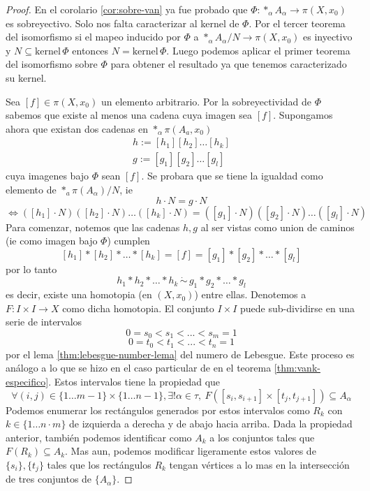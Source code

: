 \begin{proof}
  En el corolario \ref{cor:sobre-van} ya fue probado que \(\Phi :
  *_\alpha A_\alpha \to \pi (X, x_0)\) es sobreyectivo. Solo nos falta
  caracterizar al kernel de \(\Phi\). Por el tercer teorema del
  isomorfismo
  si el mapeo inducido por \(\Phi\) a \(*_\alpha A_\alpha / N \to \pi (X,
  x_0)\) es inyectivo y \(N \subseteq \text{kernel}\, \Phi\) entonces \(N =
  \text{kernel} \, \Phi\). Luego podemos aplicar el primer teorema del
  isomorfismo sobre \(\Phi\) para obtener el resultado ya que tenemos
  caracterizado su kernel.

  Sea \([f] \in \pi (X, x_0)\) un elemento arbitrario. Por la
  sobreyectividad de \(\Phi\) sabemos que existe al menos una cadena
  cuya imagen sea \([f]\). Supongamos ahora que existan dos cadenas en
  \(*_\alpha \pi (A_a, x_0)\)
  \begin{gather*}
    h := [h_1][h_2]\dotsc [h_k] \\
    g := [g _1][g _2]\dotsc [g _l]
  \end{gather*}
  cuya imagenes bajo \(\Phi\) sean \([f]\). Se probara que se tiene la
  igualdad como elemento de \(*_a \pi (A_\alpha) / N\), ie
  \[ h \cdot N = g\cdot N\]
  \[ \iff ([h_1]\cdot N) ([h_2] \cdot N) \dotsc ([h_k] \cdot N) = ([g _1] \cdot
    N) ([g _2] \cdot N) \dotsc ([g _l] \cdot N) \]
  Para comenzar, notemos que las cadenas \(h,g\) al ser vistas como
  union de caminos (ie como imagen bajo \(\Phi\)) cumplen
  \[ [h_1] * [h_2] * \dotsc * [h_k] = [f] = [g _1] * [g _2] * \dotsc * [g _l] \]
  por lo tanto
  \[ h_1 * h_2 * \dotsc * h_k \, \dot \sim \, g _1 * g _2 * \dotsc *
    g _l \]
  es decir, existe una homotopia (en \((X,x_0)\)) entre ellas. Denotemos
  a \(F : I \times I \to X\) como dicha homotopia. El conjunto \(I
  \times I\) puede sub-dividirse en una serie de intervalos
  \[ 0 = s_0 < s_1 < ... < s_m = 1 \]
  \[ 0 = t_0 < t_1 < ... < t_n = 1 \]
  por el lema \ref{thm:lebesgue-number-lema} del numero de Lebesgue.
  Este proceso es análogo a lo que se hizo en el caso particular de
  \vank en el teorema \ref{thm:vank-especifico}. Estos intervalos tiene
  la propiedad que
  \[ \forall (i,j) \in \{1 \dotsc m-1 \} \times \{1 \dotsc n - 1\},
    \exists ! \alpha \in \tau,\ F \left( [s_i, s_{i+1}] \times [t_j,
    t_{j+1}] \right) \subseteq A_\alpha \]
  Podemos enumerar los rectángulos generados por estos intervalos como
  \(R_k\) con \(k \in \{1 \dotsc n\cdot m\}\) de izquierda a derecha y
  de abajo hacia arriba. Dada la propiedad anterior, también podemos
  identificar como \( A_k\) a los conjuntos tales que \(F \left( R_k
  \right) \subseteq A_k \). Mas aun, podemos modificar ligeramente estos
  valores de \(\{s_i\}, \{t_j\}\) tales que los rectángulos \(R_k\) tengan
  vértices a lo mas en la intersección de tres conjuntos de
  \(\{A_\alpha\}\).


\end{proof}
